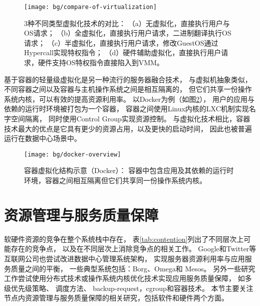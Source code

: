 \begin{figure}[t]
  \centering
  \texttt{[image: bg/compare-of-virtualization]}
  \caption[3种不同类型虚拟化技术的对比]{3种不同类型虚拟化技术的对比：
    （a）无虚拟化，直接执行用户与OS请求；
    （b）全虚拟化，直接执行用户请求，二进制翻译执行OS请求；
    （c）半虚拟化，直接执行用户请求，修改GuestOS通过Hypercall实现特权指令；
    （d）硬件辅助虚拟化，直接执行用户请求，硬件支持OS特权指令直接陷入到VMM。}
  \label{fig:compare-of-virt}
\end{figure}

基于容器的轻量级虚拟化是另一种流行的服务器融合技术，
与虚拟机抽象类似，不同容器之间以及容器与主机操作系统之间是相互隔离的，
但它们共享一份操作系统内核，可以有效的提高资源利用率。
以Docker为例（如图\ref{fig:docker-overview}），
用户的应用与依赖的运行时环境被打包为一个容器，
容器之间使用Linux内核的LXC\cite{lxc}机制实现名字空间隔离，
同时使用Control Group\cite{cgroup}实现资源控制。
与虚拟化技术相比，容器技术最大的优点是它具有更少的资源占用，以及更快的启动时间，
因此也被普遍运行在数据中心场景中。

\begin{figure}[htb]
  \centering
  \begin{minipage}{0.75\textwidth}
    \texttt{[image: bg/docker-overview]}
    \caption[容器虚拟化结构示意（Docker）]{容器虚拟化结构示意（Docker）：
      容器中包含应用及其依赖的运行时环境，容器之间相互隔离但它们共享同一份操作系统内核。}
    \label{fig:docker-overview}
  \end{minipage}
\end{figure}



\section{资源管理与服务质量保障}


软硬件资源的竞争在整个系统栈中存在，
表\ref{tab:contention}列出了不同层次上可能存在的竞争点，
以及在不同层次上消除竞争点的相关工作。
Google和Twitter等互联网公司也尝试改进数据中心管理系统架构，
实现服务器资源利用率与应用服务质量之间的平衡，
一些典型系统包括：Borg\cite{borg:2015}、Omega\cite{Schwarzkopf_omega_2013}和
Mesos\cite{Hindman:2011:Mesos}。
另外一些研究工作尝试使用分布式技术或操作系统内核优化技术实现应用服务质量保障，
如多级优先级策略\cite{Reiss_googletrace_2012}、
调度方法\cite{delimitrou_paragon:_2013, delimitrou_quasar:_2014, mars_heterogeneity_2011,
kozyrakis_reconciling_2014, Novakovi:ATC2013}、
backup-request\cite{dean_tail_2013}，cgroup\cite{cgroup}和容器技术\cite{lxc}。 
本节主要关注节点内资源管理与服务质量保障的相关研究，包括软件和硬件两个方面。

